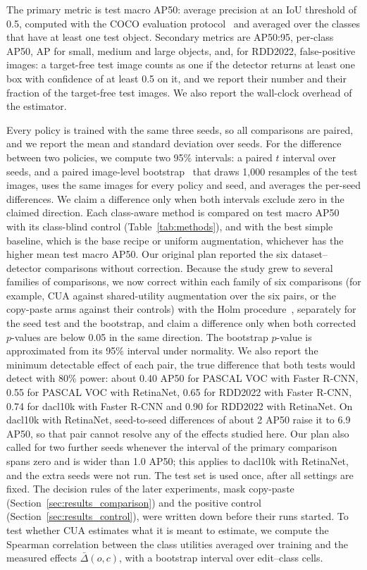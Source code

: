 \documentclass[conference]{IEEEtran}
\begin{document}
The primary metric is test macro AP50: average precision at an IoU threshold of 0.5, computed with the COCO evaluation protocol~\cite{lin2014coco} and averaged over the classes that have at least one test object. Secondary metrics are AP50:95, per-class AP50, AP for small, medium and large objects, and, for RDD2022, false-positive images: a target-free test image counts as one if the detector returns at least one box with confidence of at least 0.5 on it, and we report their number and their fraction of the target-free test images. We also report the wall-clock overhead of the estimator.

Every policy is trained with the same three seeds, so all comparisons are paired, and we report the mean and standard deviation over seeds. For the difference between two policies, we compute two 95\% intervals: a paired $t$ interval over seeds, and a paired image-level bootstrap~\cite{efron1979} that draws 1,000 resamples of the test images, uses the same images for every policy and seed, and averages the per-seed differences. We claim a difference only when both intervals exclude zero in the claimed direction. Each class-aware method is compared on test macro AP50 with its class-blind control (Table~\ref{tab:methods}), and with the best simple baseline, which is the base recipe or uniform augmentation, whichever has the higher mean test macro AP50. Our original plan reported the six dataset--detector comparisons without correction. Because the study grew to several families of comparisons, we now correct within each family of six comparisons (for example, CUA against shared-utility augmentation over the six pairs, or the copy-paste arms against their controls) with the Holm procedure~\cite{holm1979}, separately for the seed test and the bootstrap, and claim a difference only when both corrected $p$-values are below 0.05 in the same direction. The bootstrap $p$-value is approximated from its 95\% interval under normality. We also report the minimum detectable effect of each pair, the true difference that both tests would detect with 80\% power: about 0.40 AP50 for PASCAL VOC with Faster R-CNN, 0.55 for PASCAL VOC with RetinaNet, 0.65 for RDD2022 with Faster R-CNN, 0.74 for dacl10k with Faster R-CNN and 0.90 for RDD2022 with RetinaNet. On dacl10k with RetinaNet, seed-to-seed differences of about 2 AP50 raise it to 6.9 AP50, so that pair cannot resolve any of the effects studied here. Our plan also called for two further seeds whenever the interval of the primary comparison spans zero and is wider than 1.0 AP50; this applies to dacl10k with RetinaNet, and the extra seeds were not run. The test set is used once, after all settings are fixed. The decision rules of the later experiments, mask copy-paste (Section~\ref{sec:results_comparison}) and the positive control (Section~\ref{sec:results_control}), were written down before their runs started. To test whether CUA estimates what it is meant to estimate, we compute the Spearman correlation between the class utilities averaged over training and the measured effects $\bar\Delta(o,c)$, with a bootstrap interval over edit--class cells.
\end{document}
